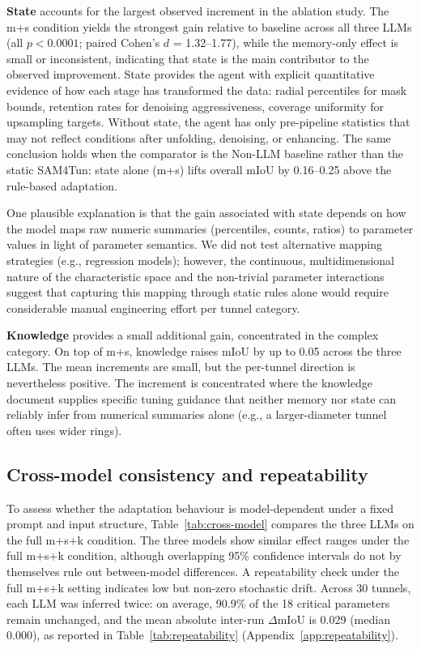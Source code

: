 \documentclass[a4paper,fleqn]{cas-dc}
\begin{document}
{\textbf{State} accounts for the largest observed increment in the ablation study. The m+s condition yields the strongest gain relative to baseline across all three LLMs (all $p < 0.0001$; paired Cohen's \mbox{$d$} = 1.32--1.77), while the memory-only effect is small or inconsistent, indicating that state is the main contributor to the observed improvement. State provides the agent with explicit quantitative evidence of how each stage has transformed the data: radial percentiles for mask bounds, retention rates for denoising aggressiveness, coverage uniformity for upsampling targets. Without state, the agent has only pre-pipeline statistics that may not reflect conditions after unfolding, denoising, or enhancing. The same conclusion holds when the comparator is the Non-LLM baseline rather than the static SAM4Tun: state alone (m+s) lifts overall mIoU by 0.16--0.25 above the rule-based adaptation.


One plausible explanation is that the gain associated with state depends on how the model maps raw numeric summaries (percentiles, counts, ratios) to parameter values in light of parameter semantics. We did not test alternative mapping strategies (e.g., regression models); however, the continuous, multidimensional nature of the characteristic space and the non-trivial parameter interactions suggest that capturing this mapping through static rules alone would require considerable manual engineering effort per tunnel category.

\textbf{Knowledge} provides a small additional gain, concentrated in the complex category. On top of m+s, knowledge raises mIoU by up to 0.05 across the three LLMs. The mean increments are small, but the per-tunnel direction is nevertheless positive. The increment is concentrated where the knowledge document supplies specific tuning guidance that neither memory nor state can reliably infer from numerical summaries alone (e.g.,  a larger-diameter tunnel often uses wider rings).


\subsection{Cross-model consistency and repeatability}\label{sec:consistency}

To assess whether the adaptation behaviour is model-dependent under a fixed prompt and input structure, Table~\ref{tab:cross-model} compares the three LLMs on the full m+s+k condition. The three models show similar effect ranges under the full m+s+k condition, although overlapping 95\% confidence intervals do not by themselves rule out between-model differences.
A repeatability check under the full \mbox{m+s+k} setting indicates low but non-zero stochastic drift. Across 30 tunnels, each LLM was inferred twice: on average, 90.9\% of the 18 critical parameters remain unchanged, and the mean absolute inter-run \mbox{$\Delta$}mIoU is 0.029 (median 0.000), as reported in Table~\ref{tab:repeatability} (Appendix~\ref{app:repeatability}).

}
\end{document}

